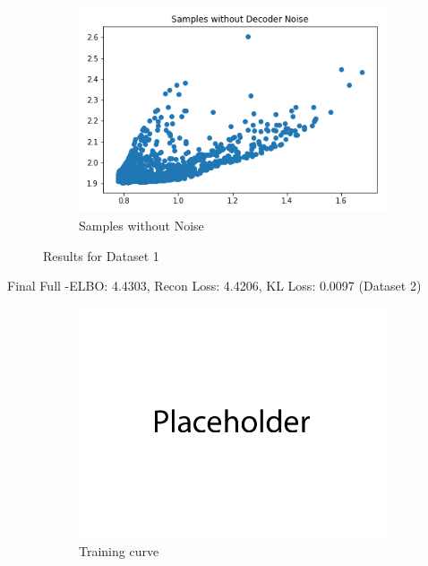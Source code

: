 \documentclass{article}
\begin{document}
\begin{enumerate}[(a)]
\begin{figure}[H]
\begin{subfigure}{0.32\textwidth}
        \centering
        \includegraphics[width=\textwidth]{figures/q1_b_dset1_sample_without_noise.png}
        \caption{Samples without Noise}
    \end{subfigure}
    \caption{Results for Dataset 1}
\end{figure}
Final Full -ELBO: 4.4303, Recon Loss: 4.4206, KL Loss: 0.0097 (Dataset 2)
\begin{figure}[H]
    \centering
    \begin{subfigure}{0.32\textwidth}
        \centering
        \includegraphics[width=\textwidth]{figures/q1_b_dset2_train_plot.png}
        \caption{Training curve}
    \end{subfigure}
    \begin{subfigure}{0.32\textwidth}
        \centering

\end{subfigure}
\end{figure}
\end{enumerate}
\end{document}
